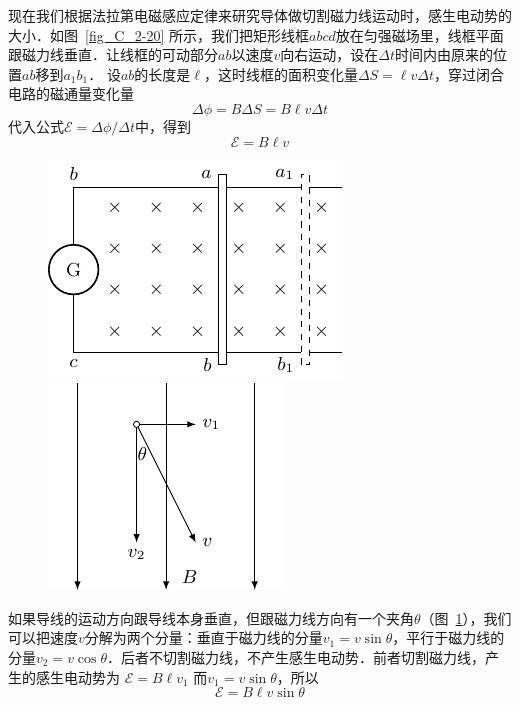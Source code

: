 现在我们根据法拉第电磁感应定律来研究导体做切割磁力线运动时，感生电动势的大小．如图~\ref{fig_C_2-20} 所示，我们把矩形线框$abcd$放在匀强磁场里，线框平面跟磁力线垂直．让线框的可动部分$ab$以速度$v$向右运动，设在$\Delta t$时间内由原来的位置$ab$移到$a_1b_1$． 设$ab$的长度是$\ell$，这时线框的面积变化量$\Delta S=\ell v\Delta t$，穿过闭合电路的磁通量变化量
\[\Delta \phi=B\Delta S=B\ell v\Delta t\]
代入公式$\mathcal{E}=\Delta \phi/\Delta t$中，得到
\begin{equation}\label{eq_C_2-3}
    \mathcal{E}=B\ell v
\end{equation}
\begin{figure}[htbp]
    \centering
    \begin{minipage}[t]{0.48\textwidth}
        \centering
        \includegraphics{fig/C/2-20.pdf}
        \caption{}\label{fig_C_2-20}
    \end{minipage}
    \begin{minipage}[t]{0.48\textwidth}
        \centering
        \includegraphics{fig/C/2-21.pdf}
        \caption{}\label{fig_C_2-21}
    \end{minipage}
\end{figure}

如果导线的运动方向跟导线本身垂直，但跟磁力线方向有一个夹角$\theta$（图~\ref{fig_C_2-21}），我们可以把速度$v$分解为两个分量：垂直于磁力线的分量$v_1=v\sin\theta$，平行于磁力线的分量$v_2=v\cos\theta$．后者不切割磁力线，不产生感生电动势．前者切割磁力线，产生的感生电动势为
$\mathcal{E}=B\ell v_1$
而$v_1=v\sin\theta$，所以
\begin{equation}\label{eq_C_2-4}
    \mathcal{E}=B\ell v\sin\theta
\end{equation}

